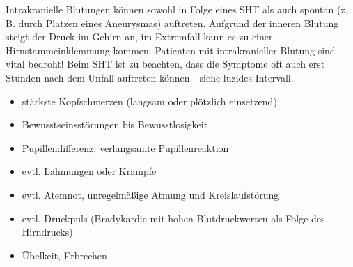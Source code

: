 {Intrakranielle Blutungen können sowohl in Folge eines SHT
als auch spontan (z.\,B. durch Platzen eines Aneurysmas)
auftreten. Aufgrund der inneren Blutung steigt der Druck im
Gehirn an, im Extremfall kann es zu einer
Hirnstammeinklemmung kommen. Patienten mit intrakranieller
Blutung sind vital bedroht! Beim SHT ist zu beachten, dass
die Symptome oft auch erst Stunden nach dem Unfall auftreten
können - siehe luzides Intervall. 
}{
\begin{itemize}
    \item stärkste Kopfschmerzen (langsam oder plötzlich einsetzend)
    \item Bewusstseinsstörungen bis Bewusstlosigkeit
    \item Pupillendifferenz, verlangsamte Pupillenreaktion
    \item evtl. Lähmungen oder Krämpfe
    \item evtl. Atemnot, unregelmäßige Atmung und Kreislaufstörung
    \item evtl. Druckpuls (Bradykardie mit hohen Blutdruckwerten als Folge des
    Hirndrucks)
    \item Übelkeit, Erbrechen
\end{itemize}
}{}{}{}










